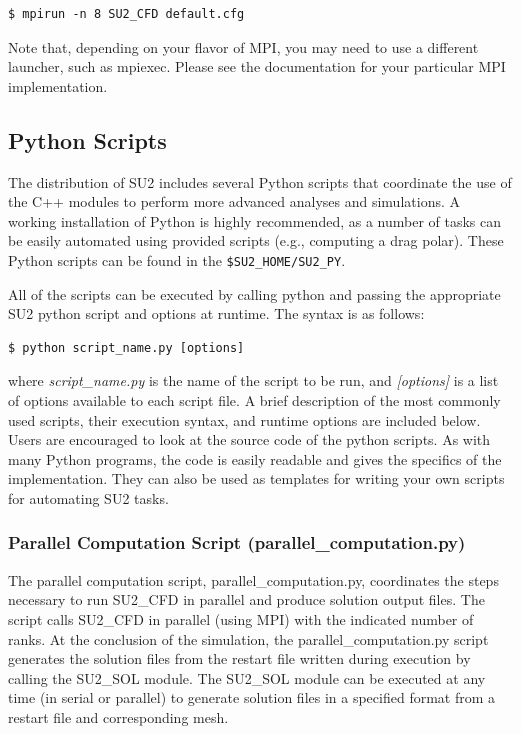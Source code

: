 \documentclass[12pt, a4paper, twoside]{article}
\begin{document}
\begin{lstlisting}
$ mpirun -n 8 SU2_CFD default.cfg
\end{lstlisting}


Note that, depending on your flavor of MPI, you may need to use a different launcher, such as mpiexec. Please see the documentation for your particular MPI implementation.

\subsection{Python Scripts}

The distribution of SU2 includes several Python scripts that coordinate the use of the C++ modules to perform more advanced analyses and simulations. A working installation of Python is highly recommended, as a number of tasks can be easily automated using provided scripts (e.g., computing a drag polar). These Python scripts can be found in the \verb|$SU2_HOME/SU2_PY|.

All of the scripts can be executed by calling python and passing the appropriate SU2 python script and options at runtime. The syntax is as follows:
\begin{lstlisting}
$ python script_name.py [options]
\end{lstlisting}


where \textit{script\_name.py} is the name of the script to be run, and \textit{[options]} is a list of options available to each script file. A brief description of the most commonly used scripts, their execution syntax, and runtime options are included below. Users are encouraged to look at the source code of the python scripts. As with many Python programs, the code is easily readable and gives the specifics of the implementation. They can also be used as templates for writing your own scripts for automating SU2 tasks.

\subsubsection{Parallel Computation Script (parallel\_computation.py)}

The parallel computation script, parallel\_computation.py, coordinates the steps necessary to run SU2\_CFD in parallel and produce solution output files. The script calls SU2\_CFD in parallel (using MPI) with the indicated number of ranks. At the conclusion of the simulation, the parallel\_computation.py script generates the solution files from the restart file written during execution by calling the SU2\_SOL module. The SU2\_SOL module can be executed at any time (in serial or parallel) to generate solution files in a specified format from a restart file and corresponding mesh.
\end{document}
